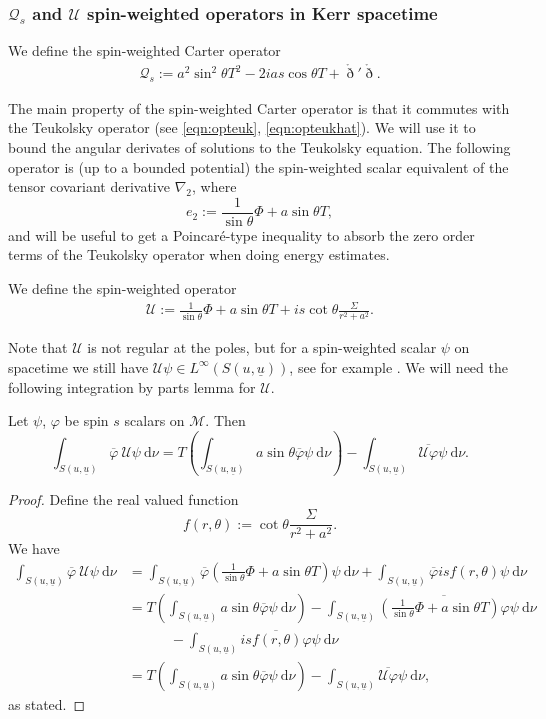 \documentclass[reqno]{amsart}
\numberwithin{equation}{section}
\newcommand{\mcm}{\mathcal{M}}
\newcommand{\mcq}{\mathcal{Q}}
\newcommand{\mcu}{\mathcal{U}}
\newcommand{\ubar}{{\underline{u}}}
\newcommand{\dee}{\mathrm{d}}
\newcommand{\drond}{\mathring{\eth}}
\theoremstyle{plain}
\theoremstyle{definition}
\theoremstyle{remark}
\numberwithin{equation}{section}
\begin{document}
\subsubsection{$\mcq_s$ and $\mcu$ spin-weighted operators in Kerr spacetime}
\begin{defi}
We define the spin-weighted Carter operator 
\begin{align}\label{eqn:carter}
    \mcq_s:=a^2\sin^2\theta T^2-2ias\cos\theta T +\drond'\drond.
\end{align}
\end{defi}
The main property of the spin-weighted Carter operator is that it commutes with the Teukolsky operator (see \eqref{eqn:opteuk}, \eqref{eqn:opteukhat}). We will use it to bound the angular derivates of solutions to the Teukolsky equation. The following operator is (up to a bounded potential) the spin-weighted scalar equivalent of the tensor covariant derivative $\nabla_2$, where 
$$e_2:=\frac{1}{\sin\theta}\Phi+a\sin\theta T,$$
and will be useful to get a Poincaré-type inequality to absorb the zero order terms of the Teukolsky operator when doing energy estimates.
\begin{defi}We define the spin-weighted operator
\begin{align}\label{eqn:defU}
    \mcu:=\frac{1}{\sin\theta}\Phi+a\sin\theta T+is\cot\theta\frac{\Sigma}{r^2+a^2}.
\end{align}
\end{defi}
Note that $\mcu$ is not regular at the poles, but for a spin-weighted scalar $\psi$ on spacetime we still have $\mcu\psi\in L^\infty(S(u,\ubar))$, see for example \cite[Eq. (2.34)]{sbierski}. We will need the following integration by parts lemma for $\mcu$.
\begin{lem}\label{lem:intpartU}
    Let $\psi$, $\varphi$ be spin $s$ scalars on $\mcm$. Then 
    $$\int_{S(u,\ubar)}\overline{\varphi}\:\mcu\psi\:\dee\nu=T\left(\int_{S(u,\ubar)}a\sin\theta\overline{\varphi}\psi\:\dee\nu\right)-\int_{S(u,\ubar)}\overline{\mcu\varphi}\psi\:\dee\nu.$$
\end{lem}
\begin{proof}
Define the real valued function
$$f(r,\theta):=\cot\theta\frac{\Sigma}{r^2+a^2}.$$
We have
\begin{align*}
    \int_{S(u,\ubar)}\overline{\varphi}\:\mcu\psi\:\dee\nu&=\int_{S(u,\ubar)}\overline{\varphi}\left(\frac{1}{\sin\theta}\Phi+a\sin\theta T\right)\psi\:\dee\nu+\int_{S(u,\ubar)}\overline{\varphi}isf(r,\theta)\psi\:\dee\nu\\
    &=T\left(\int_{S(u,\ubar)}a\sin\theta\overline{\varphi}\psi\:\dee\nu\right)-\int_{S(u,\ubar)}\overline{\left(\frac{1}{\sin\theta}\Phi+a\sin\theta T\right)\varphi}\psi\:\dee\nu\\
    &\quad\quad\quad-\int_{S(u,\ubar)}\overline{isf(r,\theta)\varphi}\psi\:\dee\nu\\
    &=T\left(\int_{S(u,\ubar)}a\sin\theta\overline{\varphi}\psi\:\dee\nu\right)-\int_{S(u,\ubar)}\overline{\mcu\varphi}\psi\:\dee\nu,
\end{align*}
as stated.
\end{proof}
\end{document}
